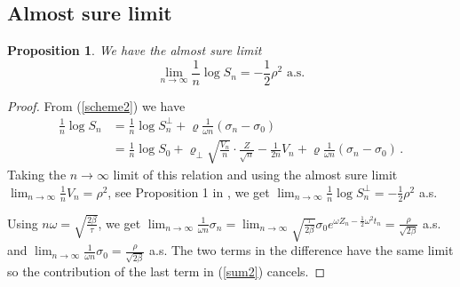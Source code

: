 \documentclass[11pt]{article}
\numberwithin{equation}{section}
\theoremstyle{plain}
\newtheorem{proposition}[theorem]{Proposition}
\begin{document}
\subsection{Almost sure limit}

\begin{proposition}\label{prop:LLN}
We have the almost sure limit 
\begin{equation}\label{LLN}
\lim_{n\to \infty} \frac{1}{n} \log S_n = - \frac12  \rho^2 \mbox{ a.s.}
\end{equation}
\end{proposition}


\begin{proof}
From (\ref{scheme2}) we have
\begin{align}
\frac{1}{n} \log S_n &= \frac{1}{n} \log S_n^\perp 
+ \varrho \frac{1}{\omega n} (\sigma_{n}-\sigma_0) \\
&= \frac{1}{n} \log S_0 + \varrho_\perp \sqrt{\frac{V_n}{n}} \cdot 
\frac{Z}{\sqrt{n}} - \frac{1}{2n} V_n + \varrho \frac{1}{\omega n} 
(\sigma_{n} - \sigma_{0})\,.
\nonumber
\end{align}
Taking the $n\to \infty$ limit of this relation and using the almost sure limit 
$\lim_{n\to \infty} \frac{1}{n} V_n = \rho^2 $, see Proposition 1 in
\cite{PZDiscreteAsian}, we get
$\lim_{n\to \infty} \frac{1}{n} \log S_n^\perp = - \frac12  \rho^2$
a.s.

Using $n\omega = \sqrt{\frac{2\beta}{\tau}}$, we get 
$\lim_{n\to \infty} \frac{1}{\omega n} \sigma_n = 
\lim_{n\to \infty} \sqrt{\frac{\tau}{2\beta}} 
\sigma_0 e^{\omega Z_n - \frac12 \omega^2 t_n} = \frac{\rho}{\sqrt{2\beta}}$
a.s.
and
$\lim_{n\to \infty} \frac{1}{\omega n} \sigma_0 = \frac{\rho}{\sqrt{2\beta}}$
a.s.
The two terms in the difference have the same limit so the contribution of
the last term  in (\ref{sum2}) cancels. 
\end{proof}
\end{document}
